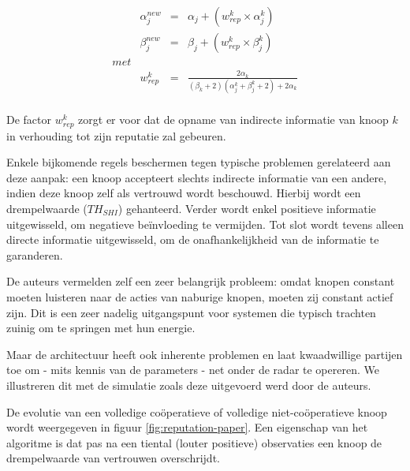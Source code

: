 \begin{equation} \label{eq:reputation-update-indirect}
\begin{array}{rrcl}
& \alpha^{new}_j & = & \alpha_j + ( w^k_{rep} \times \alpha^k_j ) \\
& \beta^{new}_j  & = & \beta_j  + ( w^k_{rep} \times \beta^k_j )  \\
met \\
& w^k_{rep}      & = & \frac{2 \alpha_k}{(\beta_k+2) (\alpha^k_j+\beta^k_j+2)+2 \alpha_k} \\
\end{array}
\end{equation}

De factor $w^k_{rep}$ zorgt er voor dat de opname van indirecte informatie van
knoop $k$ in verhouding tot zijn reputatie zal gebeuren.

Enkele bijkomende regels beschermen tegen typische problemen gerelateerd aan
deze aanpak: een knoop accepteert slechts indirecte informatie van een andere,
indien deze knoop zelf als vertrouwd wordt beschouwd. Hierbij wordt een
drempelwaarde ($TH_{SHI}$) gehanteerd. Verder wordt enkel positieve informatie
uitgewisseld, om negatieve be\"invloeding te vermijden. Tot slot wordt tevens
alleen directe informatie uitgewisseld, om de onafhankelijkheid van de
informatie te garanderen.

De auteurs vermelden zelf een zeer belangrijk probleem: omdat knopen constant
moeten luisteren naar de acties van naburige knopen, moeten zij constant actief
zijn. Dit is een zeer nadelig uitgangspunt voor systemen die typisch trachten
zuinig om te springen met hun energie.

Maar de architectuur heeft ook inherente problemen en laat kwaadwillige
partijen toe om - mits kennis van de parameters - net onder de radar te
opereren. We illustreren dit met de simulatie zoals deze uitgevoerd werd door
de auteurs.

De evolutie van een volledige co\"operatieve of volledige niet-co\"operatieve
knoop wordt weergegeven in figuur \ref{fig:reputation-paper}. Een eigenschap
van het algoritme is dat pas na een tiental (louter positieve) observaties een
knoop de drempelwaarde van vertrouwen overschrijdt.

